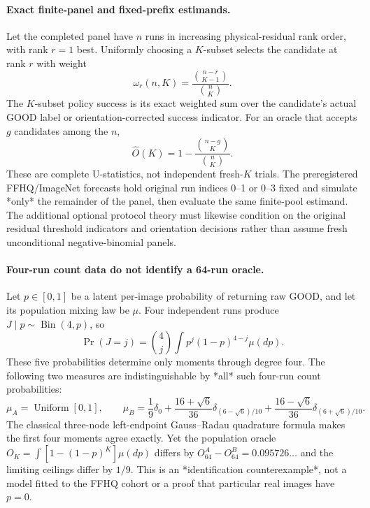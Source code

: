 \paragraph{Exact finite-panel and fixed-prefix estimands.}
Let the completed panel have $n$ runs in increasing physical-residual
rank order, with rank $r=1$ best. Uniformly choosing a $K$-subset
selects the candidate at rank $r$ with weight
\begin{equation}\label{eq:suppl-subset-weight}
 \omega_r(n,K)=\frac{\binom{n-r}{K-1}}{\binom nK}.
\end{equation}
The $K$-subset policy success is its exact weighted sum over the
candidate's actual GOOD label or orientation-corrected success
indicator. For an oracle that accepts $g$ candidates among the $n$,
\begin{equation}\label{eq:suppl-oracle-subset}
 \widehat O(K)=1-\frac{\binom{n-g}{K}}{\binom nK}.
\end{equation}
These are complete U-statistics, not independent fresh-$K$ trials.
The preregistered FFHQ/ImageNet forecasts hold original run indices
0--1 or 0--3 fixed and simulate *only* the remainder of the panel,
then evaluate the same finite-pool estimand. The additional optional
protocol theory must likewise condition on the original residual
threshold indicators and orientation decisions rather than assume
fresh unconditional negative-binomial panels.

\paragraph{Four-run count data do not identify a 64-run oracle.}
Let $p\in[0,1]$ be a latent per-image probability of returning raw GOOD,
and let its population mixing law be $\mu$. Four independent runs
produce $J\mid p\sim\operatorname{Bin}(4,p)$, so
\begin{equation}\label{eq:suppl-four-moments}
 \Pr(J=j)=\binom4j\int p^j(1-p)^{4-j}\mu(dp).
\end{equation}
These five probabilities determine only moments through degree four.
The following two measures are indistinguishable by *all* such
four-run count probabilities:
\[
 \mu_A=\operatorname{Uniform}[0,1],\qquad
 \mu_B=\frac19\delta_0+
 \frac{16+\sqrt6}{36}\delta_{(6-\sqrt6)/10}+
 \frac{16-\sqrt6}{36}\delta_{(6+\sqrt6)/10}.
\]
The classical three-node left-endpoint Gauss--Radau quadrature formula
makes the first four moments agree exactly. Yet the population oracle
$O_K=\int[1-(1-p)^K]\mu(dp)$ differs by
$O^A_{64}-O^B_{64}=0.095726\ldots$ and the limiting ceilings
differ by $1/9$. This is an *identification counterexample*, not a
model fitted to the FFHQ cohort or a proof that particular real
images have $p=0$.

